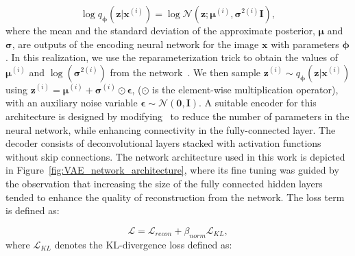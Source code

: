 \small
\begin{equation}
    \log q_{\bm{\phi}}(\mathbf{z}| \mathbf{x}^{(i)}) = \log \mathcal{N}(\mathbf{z}; \bm{\mu}^{(i)}, {\bm{\sigma}}^{2(i)}\mathbf{I}),
\end{equation}
\normalsize
where the mean and the standard deviation of the approximate posterior, $\bm{\mu}$ and $\bm{\sigma}$, are outputs of the encoding neural network for the image $\mathbf{x}$ with parameters $\bm{\phi}$. In this realization, we use the reparameterization trick to obtain the values of $\bm{\mu}^{(i)}$ and $\log({\bm{\sigma}}^{2(i)})$ from the network~\cite{doersch2016tutorial}. We then sample $\mathbf{z}^{(i)} \sim q_{\bm{\phi}}(\mathbf{z} | \mathbf{x}^{(i)})$ using $\mathbf{z}^{(i)} = \bm{\mu}^{(i)} + \bm{\sigma}^{(i)}\odot\bm{\epsilon}$, ($\odot$ is the element-wise multiplication operator), with an auxiliary noise variable $\bm{\epsilon} \sim \mathcal{N}(\mathbf{0},\mathbf{I})$.  A suitable encoder for this architecture is designed by modifying~\cite{loquercio2018dronet} to reduce the number of parameters in the neural network, while enhancing connectivity in the fully-connected layer. The decoder consists of deconvolutional layers stacked with activation functions without skip connections. The network architecture used in this work is depicted in Figure~\ref{fig:VAE_network_architecture}, where its fine tuning was guided by the observation that increasing the size of the fully connected hidden layers tended to enhance the quality of reconstruction from the network. The loss term is defined as:

\small
\begin{equation}
    \mathcal{L} = \mathcal{L}_{recon} + \beta_{norm}\mathcal{L}_{KL},
\end{equation}
\normalsize
where $\mathcal{L}_{KL}$ denotes the KL-divergence loss defined as:

